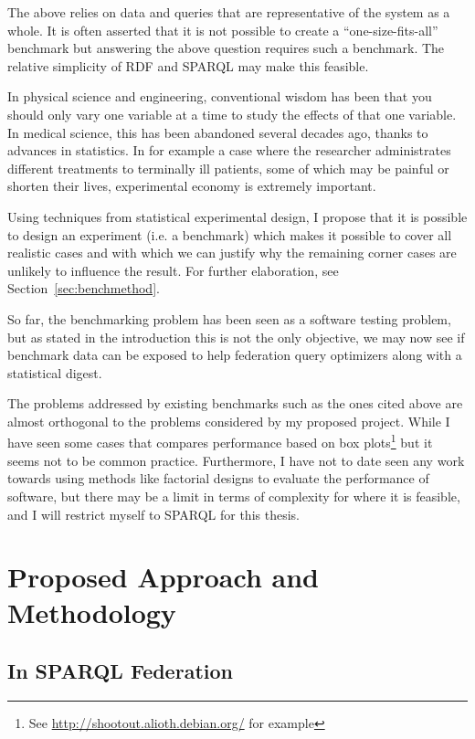 \documentclass{llncs}
\begin{document}
The above relies on data and queries that are representative of the
system as a whole. It is often asserted that it is not possible to
create a ``one-size-fits-all'' benchmark but answering the above
question requires such a benchmark. The relative simplicity of RDF and
SPARQL may make this feasible.

In physical science and engineering, conventional wisdom has been that
you should only vary one variable at a time to study the effects of
that one variable. In medical science, this has been abandoned several
decades ago, thanks to advances in statistics. In for example a case where
the researcher administrates different treatments to terminally ill
patients, some of which may be painful or shorten their lives,
experimental economy is extremely important.

Using techniques from statistical experimental design, I propose
that it is possible to design an experiment (i.e. a benchmark) which
makes it possible to cover all realistic cases and with which we can justify
why the remaining corner cases are unlikely to influence the
result. For further elaboration, see Section~\ref{sec:benchmethod}.

So far, the benchmarking problem has been seen as a software testing
problem, but as stated in the introduction this is not the only
objective, we may now see if benchmark data can be exposed to help
federation query optimizers along with a statistical digest.

The problems addressed by existing benchmarks such as the ones cited
above are almost orthogonal to the problems considered by my proposed
project. While I have seen some cases that compares performance based
on box plots\footnote{See \url{http://shootout.alioth.debian.org/} for example}
but it seems not to be common practice. Furthermore, I have not to date seen
any work towards using methods like factorial designs to evaluate
the performance of software, but there may be a limit in terms of
complexity for where it is feasible, and I will restrict myself to
SPARQL for this thesis.



\section{Proposed Approach and Methodology}

\subsection{In SPARQL Federation}
\end{document}
